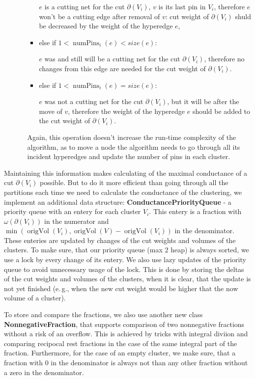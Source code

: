 \documentclass[acmsmall,nonacm,screen,review]{acmart}
\newcommand{\eg}{e.\,g.,\xspace}
\DeclareMathOperator{\origVol}{origVol}
\DeclareMathOperator{\numPins}{numPins}
\begin{document}
\begin{itemize}
\begin{itemize}
\begin{itemize}
$e$ is a cutting net for the cut $\partial(V_i)$, $v$ is its last pin in $V_i$, 
therefore $e$ won't be a cutting edge after removal of $v$: cut weight of 
$\partial(V_i)$ shuld be decreased by the weight of the hyperedge $e$,

    \item else if $1 < \numPins_i(e) < size(e)$:

$e$ was and still will be a cutting net for the cut $\partial(V_i)$, 
therefore no changes from this edge are needed for the cut weight of $\partial(V_i)$.

    \item else if $1 < \numPins_i(e) = size(e)$:

$e$ was not a cutting net for the cut $\partial(V_i)$, but it will be after the move 
of $v$, therefore the weight of the hyperedge $e$ should be added to the cut 
weight of $\partial(V_i)$.
\end{itemize}
Again, this operation doesn't increase the run-time complexity of the algorithm,
as to move a node the algorithm needs to go through all its incident hyperedges and
update the number of pins in each cluster.

\end{itemize}
\end{itemize}

Maintaining this information makes calculating of the maximal conductance of 
a cut $\partial(V_i)$ possible. But to do it more efficient than going through 
all the partitions each time we need to calculate the conductance of the clustering, 
we implement an additional data structure: \textbf{ConductancePriorityQueue} - a 
priority queue with an entery for each cluster $V_i$. This entery is a fraction with 
$\omega(\partial(V_i))$ in the numerator and 
$\min(\origVol(V_i), \origVol(V) - \origVol(V_i))$ in the denominator. These 
enteries are updated by changes of the cut weights and volumes of the clusters.
To make sure, that our priority queue (max 2 heap) is always sorted, we use a
lock by every change of its entery. We also use lazy updates of the priority queue
to avoid unnecessary usage of the lock. This is done by storing the deltas of the
cut weights and volumes of the clusters, when it is clear, that the update is not 
yet finished (\eg when the new cut weight would be higher that the now volume of 
a cluster).

To store and compare the fractions, we also use another new class 
\textbf{NonnegativeFraction}, that supports comparison of two nonnegative fractions 
without a risk of an overflow. This is achieved by tricks with integral diviion and
comparing recipocal rest fractions in the case of the same integral part of the 
fraction. Furthermore, for the case of an empty cluster, we make sure, that a fraction
with $0$ in the denominator is always not than any other fraction without a zero in 
the denominator.
\end{document}
